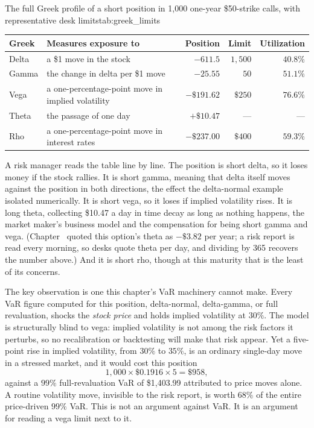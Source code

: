 \documentclass[../ai_in_finance]{subfiles}
\begin{document}
\begin{booktable}[htbp]{The full Greek profile of a short position in 1,000 one-year \$50-strike calls, with representative desk limits}{tab:greek_limits}
\begin{tabular}{L{2.0cm}L{4.6cm}rrr}
\toprule
Greek & Measures exposure to & Position & Limit & Utilization \\
\midrule
Delta   & a \$1 move in the stock            & $-611.5$   & $1{,}500$ & $40.8\%$ \\
Gamma   & the change in delta per \$1 move   & $-25.55$   & $50$      & $51.1\%$ \\
Vega    & a one-percentage-point move in implied volatility & $-\$191.62$ & $\$250$  & $76.6\%$ \\
Theta   & the passage of one day             & $+\$10.47$ & ---       & ---      \\
Rho     & a one-percentage-point move in interest rates & $-\$237.00$ & $\$400$  & $59.3\%$ \\
\bottomrule
\end{tabular}
\end{booktable}

A risk manager reads the table line by line. The position is short delta, so it loses money if the stock rallies. It is short gamma, meaning that delta itself moves against the position in both directions, the effect the delta-normal example isolated numerically. It is short vega, so it loses if implied volatility rises. It is long theta, collecting \$10.47 a day in time decay as long as nothing happens, the market maker's business model and the compensation for being short gamma and vega. (Chapter~ quoted this option's theta as $-\$3.82$ per year; a risk report is read every morning, so desks quote theta per day, and dividing by 365 recovers the number above.) And it is short rho, though at this maturity that is the least of its concerns.

The key observation is one this chapter's VaR machinery cannot make. Every VaR figure computed for this position, delta-normal, delta-gamma, or full revaluation, shocks the \emph{stock price} and holds implied volatility at $30\%$. The model is structurally blind to vega: implied volatility is not among the risk factors it perturbs, so no recalibration or backtesting will make that risk appear. Yet a five-point rise in implied volatility, from $30\%$ to $35\%$, is an ordinary single-day move in a stressed market, and it would cost this position
\begin{equation*}
1{,}000 \times \$0.1916 \times 5 = \$958,
\end{equation*}
against a $99\%$ full-revaluation VaR of \$1,403.99 attributed to price moves alone. A routine volatility move, invisible to the risk report, is worth $68\%$ of the entire price-driven $99\%$ VaR. This is not an argument against VaR. It is an argument for reading a vega limit next to it.
\end{document}
